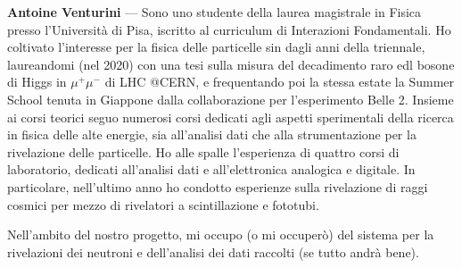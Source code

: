 \documentclass[twocolumn, a4paper]{article}
\newenvironment{crewbio}[1]{\noindent\textbf{#1} ---}{\\}
\begin{document}
\begin{crewbio}{Antoine Venturini}
Sono uno studente della laurea magistrale in Fisica presso l'Università di Pisa, iscritto al curriculum di Interazioni Fondamentali. Ho coltivato l'interesse per la fisica delle particelle sin dagli anni della triennale, laureandomi (nel 2020) con una tesi sulla misura del decadimento raro edl bosone di Higgs in $\mu^+ \mu^-$ di LHC @CERN, e frequentando poi la stessa estate la Summer School tenuta in Giappone dalla collaborazione per l'esperimento Belle 2.  
Insieme ai corsi teorici seguo numerosi corsi dedicati agli aspetti sperimentali della ricerca in fisica delle alte energie, sia all'analisi dati che alla strumentazione per la rivelazione delle particelle.
Ho alle spalle l'esperienza di quattro corsi di laboratorio, dedicati all'analisi dati e all'elettronica analogica e digitale. In particolare, nell'ultimo anno ho condotto esperienze sulla rivelazione di raggi cosmici per mezzo di rivelatori a scintillazione e fototubi. 

Nell'ambito del nostro progetto, mi occupo (o mi occuperò) del sistema per la rivelazioni dei neutroni e dell'analisi dei dati raccolti (se tutto andrà bene). 
\end{crewbio}
\end{document}
